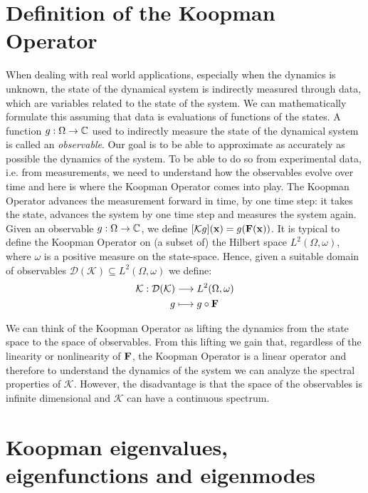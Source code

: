 \section{Definition of the Koopman Operator}
When dealing with real world applications, especially when the dynamics is unknown, the state of the dynamical system is indirectly measured through data, which are variables related to the state of the system. We can mathematically formulate this assuming that data is evaluations of functions of the states. A function $g:\Omega\to\mathbb{C}$ used to indirectly measure the state of the dynamical system is called an \emph{observable}. 
Our goal is to be able to approximate as accurately as possible the dynamics of the system. To be able to do so from experimental data, i.e. from measurements, we need to understand how the observables evolve over time and here is where the Koopman Operator comes into play. The Koopman Operator advances the measurement forward in time, by one time step: it takes the state, advances the system by one time step and measures the system again. Given an observable $g:\Omega\to\mathbb{C}$, we define $[\mathcal{K}g](\vb{x}) = g(\vb{F}(\vb{x}))$. It is typical to define the Koopman Operator on (a subset of) the Hilbert space $L^2(\Omega, \omega)$, where $\omega$ is a positive measure on the state-space. Hence, given a suitable domain of observables $\mathcal{D}(\mathcal{K}) \subseteq L^2(\Omega, \omega)$ we define:
\begin{equation}
    \label{koopman_def}
    \begin{split}
       \mathcal{K} : \mathcal{D}(\mathcal{K}) &\longrightarrow L^2(\Omega, \omega)
       \\
       g & \longmapsto g \circ \vb{F}
    \end{split}    
\end{equation}

We can think of the Koopman Operator as lifting the dynamics from the state space to the space of observables. From this lifting we gain that, regardless of the linearity or nonlinearity of $\vb{F}$, the Koopman Operator is a linear operator and therefore to understand the dynamics of the system we can analyze the spectral properties of $\mathcal{K}$. However, the disadvantage is that the space of the observables is infinite dimensional and $\mathcal{K}$ can have a continuous spectrum. 

\section{Koopman eigenvalues, eigenfunctions and eigenmodes}

